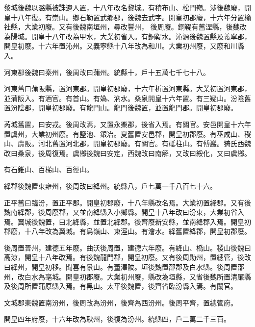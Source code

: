 \begin{pinyinscope}
 黎城後魏以潞縣被誅遺人置，十八年改名黎城。有積布山、松門嶺。涉後魏廢，開皇十八年復。有崇山。鄉石勒置武鄉郡，後魏去武字。開皇初郡廢，十六年分置榆社縣，大業初廢。又有後魏南垣州，尋改豐州，
 後周廢。銅鞮有舊涅縣，後魏改為陽城。開皇十八年改為甲水，大業初省入。有銅鞮水。沁源後魏置縣及義寧郡，開皇初廢。十六年置沁州。又義寧縣十八年改為和川。大業初州廢，又廢和川縣入。



 河東郡後魏曰秦州，後周改曰蒲州。統縣十，戶十五萬七千七十八。



 河東舊曰蒲阪縣，置河東郡。開皇初郡廢，十六年析置河東縣。大業初置河東郡，並蒲阪入。有酒官。有首山。有媯、汭水。桑泉開皇十六年置。有三疑山。汾陰舊置汾陰郡，開皇初郡廢。有龍門山。龍門後魏置，並置龍門郡。開皇初郡廢。



 芮城舊置，曰安戎。後周改焉，又置永樂郡，後省入焉。有關官。安邑開皇十六年置虞州，大業初州廢。有鹽池、銀冶。夏舊置安邑郡，開皇初郡廢。有巫咸山、稷山、虞阪。河北舊置河北郡，開皇初郡廢。有關官。有砥柱山。有傅巖。猗氏西魏改曰桑泉，後周復焉。虞鄉後魏曰安定，西魏改曰南解，又改曰綏化，又曰虞鄉。



 有石錐山、百梯山、百徑山。



 絳郡後魏置東雍州，後周改曰絳州。統縣八，戶七萬一千八百七十六。



 正平舊曰臨汾，置正平郡。開皇初郡廢，十八年縣改名焉。大業初置絳郡。又有後魏南絳郡，後周廢郡，又並南絳縣入小鄉縣。開皇十八年改曰汾東，大業初省入焉。翼城後魏置，曰北絳縣，並置北絳郡。後齊廢新安縣，並南絳郡入焉。開皇初郡廢，十八年改為翼城。有烏嶺山、東涇山。有澮水。絳舊置絳郡，開皇初郡廢。



 後周置晉州，建德五年廢。曲沃後周置，建德六年廢。有絳山、橋山。稷山後魏曰高涼，開皇十八年改焉。有後魏龍門郡，開皇初廢。又有後周勛州，置總管，後改曰絳州，開皇初移。聞喜有景山。有董澤陂。垣後魏置邵郡及白水縣。後周置邵州，改白水為亳城。開皇初郡廢。大業初州廢，縣改為垣縣，又省後魏所置清廉縣及後周所置蒲原縣入焉。有黑山。太平後魏置，後齊省臨汾縣入焉。有關官。



 文城郡東魏置南汾州，後周改為汾州，後齊為西汾州。後周平齊，置總管府。



 開皇四年府廢，十六年改為耿州，後復為汾州。統縣四，戶二萬二千三百。




\end{pinyinscope}
